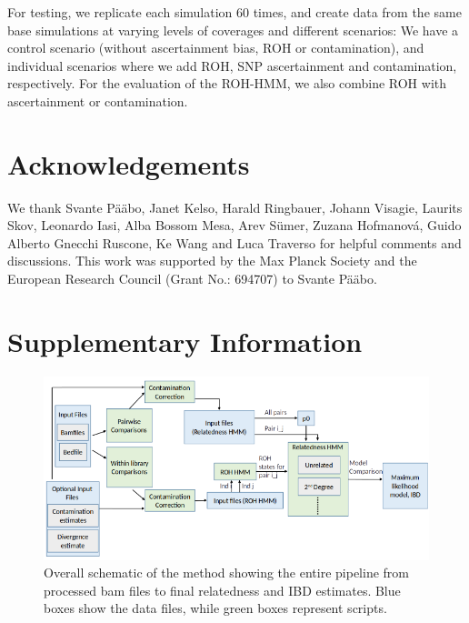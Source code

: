 \documentclass[12pt, letterpaper]{article}
\begin{document}
For testing, we replicate each simulation 60 times, and create data from the same base simulations at varying levels of coverages and different scenarios: We have a control scenario (without ascertainment bias, ROH or contamination), and individual scenarios where we add ROH, SNP ascertainment and contamination, respectively. For the evaluation of the ROH-HMM, we also combine ROH with ascertainment or contamination.


\section{Acknowledgements}
We thank Svante Pääbo, Janet Kelso, Harald Ringbauer, Johann Visagie, Laurits Skov, Leonardo Iasi, Alba Bossom Mesa, Arev Sümer, Zuzana Hofmanová, Guido Alberto Gnecchi Ruscone, Ke Wang and Luca Traverso for helpful comments and discussions. This work was supported by the Max Planck Society and the European Research Council (Grant No.: 694707) to Svante Pääbo.


\renewcommand\thefigure{\arabic{figure}}    
\section{Supplementary Information}
\setcounter{figure}{0}   


\renewcommand{\figurename}{Fig. S}
\begin{figure}[h!]
    \includegraphics[width=18cm]{plots/inkscape_finalImg/schematic1.png}
    \centering
    \caption{Overall schematic of the method showing the entire pipeline from processed bam files to final relatedness and IBD estimates. Blue boxes show the data files, while green boxes represent scripts.}
    \label{figS0:schematic}
\end{figure}
\end{document}
